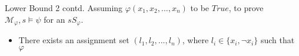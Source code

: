 \documentclass{beamer}
\newcommand{\M}{\mathcal{M}}
\begin{document}
\begin{frame}{Lower Bound 2 contd.}
    Assuming $\varphi(x_1,x_2,...,x_n)$ to be $True$, to prove $\M_{\varphi},s\vDash\psi$ for an $s S_\varphi$.
    \begin{itemize}
        \item<1-> There exists an assignment set $(l_1,l_2,...,l_n)$, where $l_i\in\{x_i,\neg{x_i}\}$ such that $\varphi$
    \end{itemize}
\end{frame}
\end{document}
